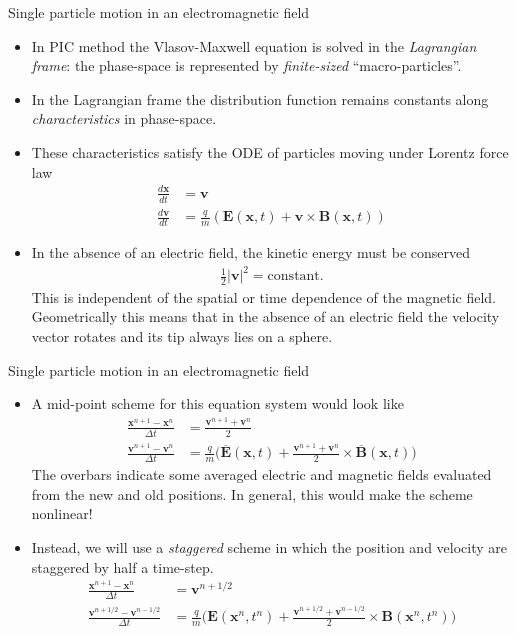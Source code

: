 \documentclass[pdf]{beamer}
\newcommand{\mvec}[1]{\mathbf{#1}}
\theoremstyle{definition}
\begin{document}
\begin{frame}{Single particle motion in an electromagnetic field}
  \small%
  \begin{itemize}
  \item In PIC method the Vlasov-Maxwell equation is solved in the
    \emph{Lagrangian frame}: the phase-space is represented by
    \emph{finite-sized} ``macro-particles''.
  \item In the Lagrangian frame the distribution
    function remains constants along \emph{characteristics} in
    phase-space.
  \item These characteristics satisfy the ODE of particles moving
    under Lorentz force law
    \begin{align*}
      \frac{d\mvec{x}}{dt} &= \mvec{v} \\
      \frac{d\mvec{v}}{dt} &= \frac{q}{m}(\mvec{E}(\mvec{x},t) + \mvec{v}\times\mvec{B}(\mvec{x},t))
    \end{align*}
  \item In the absence of an electric field, the kinetic energy must
    be conserved
    \begin{align*}
      \frac{1}{2} |\mvec{v}|^2 = \textrm{constant}.
    \end{align*}
    This is independent of the spatial or time dependence of the
    magnetic field. Geometrically this means that in the absence of an
    electric field the velocity vector rotates and its tip always lies
    on a sphere.
  \end{itemize}
\end{frame}

\begin{frame}{Single particle motion in an electromagnetic field}
  \small%
  \begin{itemize}
  \item A mid-point scheme for this equation system would look like
    \begin{align*}
    \frac{\mvec{x}^{n+1}-\mvec{x}^n}{\Delta t} &= \frac{\mvec{v}^{n+1}+\mvec{v}^n}{2} \\
    \frac{\mvec{v}^{n+1}-\mvec{v}^n}{\Delta t} &= \frac{q}{m}
      \big(
        \overline{\mvec{E}}(\mvec{x},t) +
        \frac{\mvec{v}^{n+1}+\mvec{v}^n}{2}\times\overline{\mvec{B}}(\mvec{x},t)
      \big)
    \end{align*}
    The overbars indicate some averaged electric and magnetic fields
    evaluated from the new and old positions. In general, this would
    make the scheme nonlinear!

  \item Instead, we will use a \emph{staggered} scheme in which the
    position and velocity are staggered by half a time-step.
    \begin{align*}
    \frac{\mvec{x}^{n+1}-\mvec{x}^n}{\Delta t} &= \mvec{v}^{n+1/2} \\
    \frac{\mvec{v}^{n+1/2}-\mvec{v}^{n-1/2}}{\Delta t} &= \frac{q}{m}
      \big(
        \mvec{E}(\mvec{x}^n,t^n) +
        \frac{\mvec{v}^{n+1/2}+\mvec{v}^{n-1/2}}{2}\times\mvec{B}(\mvec{x}^n,t^n)
      \big)
    \end{align*}
  \end{itemize}
\end{frame}
\end{document}
